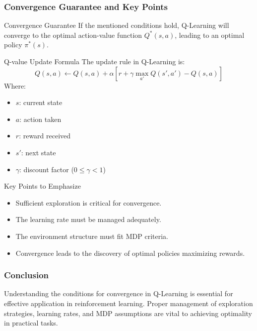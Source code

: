 \documentclass[aspectratio=169]{beamer}
\begin{document}
\begin{frame}[fragile]
    \frametitle{Convergence Guarantee and Key Points}
    \begin{block}{Convergence Guarantee}
        If the mentioned conditions hold, Q-Learning will converge to the optimal action-value function $Q^*(s, a)$, leading to an optimal policy $\pi^*(s)$.
    \end{block}

    \begin{block}{Q-value Update Formula}
        The update rule in Q-Learning is:
        \begin{equation}
            Q(s, a) \leftarrow Q(s, a) + \alpha \left[ r + \gamma \max_{a'} Q(s', a') - Q(s, a) \right]
        \end{equation}
        Where:
        \begin{itemize}
            \item $s$: current state
            \item $a$: action taken
            \item $r$: reward received
            \item $s'$: next state
            \item $\gamma$: discount factor ($0 \leq \gamma < 1$)
        \end{itemize}
    \end{block}
    
    \begin{block}{Key Points to Emphasize}
        \begin{itemize}
            \item Sufficient exploration is critical for convergence.
            \item The learning rate must be managed adequately.
            \item The environment structure must fit MDP criteria.
            \item Convergence leads to the discovery of optimal policies maximizing rewards.
        \end{itemize}
    \end{block}
\end{frame}

\begin{frame}[fragile]
    \frametitle{Conclusion}
    Understanding the conditions for convergence in Q-Learning is essential for effective application in reinforcement learning. Proper management of exploration strategies, learning rates, and MDP assumptions are vital to achieving optimality in practical tasks. 
\end{frame}
\end{document}

